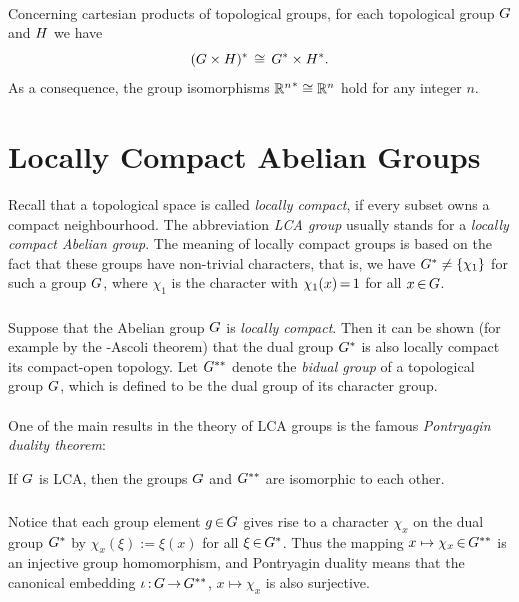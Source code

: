 \documentclass[11pt,twoside]{article}
\begin{document}
\paragraph{}
Concerning cartesian products of topological groups,
for each topological group $G$ and $H$
we have
\[
(G \times H)^*
\, \cong \,
G^* \times H^*.
\]
As a consequence,
the group isomorphisms ${{\mathbb{R}}^n}^* \cong {\mathbb{R}}^n$ hold for any integer $n$.

\section{Locally Compact Abelian Groups}
Recall that a topological space is called \textit{locally compact},
if every subset owns a compact neighbourhood.
The abbreviation \textit{LCA group} usually stands
for a \textit{locally compact Abelian group}.
The meaning of locally compact groups is based on the fact
that these groups have non-trivial characters,
that is,
we have $G^* \neq \{\chi_1\}$ for such a group ${G}$,
where $\chi_1$ is the character with $\chi_1(x) {\,=\,} 1$ for all $x {\,\in\,} G$.

\subparagraph{}
Suppose that the Abelian group ${G}$ is \textit{locally compact}.
Then it can be shown (for example by the {\ARZELA}-Ascoli theorem)
that the dual group $G^*$ is also locally compact {\wrt}
its compact-open topology.
Let $G^{**}$ denote the \textit{bidual group} 
of a topological group $G$,
which is defined to be the dual group of its character group.

\paragraph{} %
One of the main results in the theory of LCA groups is the famous
\textit{Pontryagin duality theorem}:

\begin{theorem1}\label{PONTRYAGIN_DUALITY_THEOREM}
If $G$ is LCA,
then the groups $G$ and $G^{**}$ are isomorphic to each other.
\end{theorem1}

\subparagraph{}
Notice that
each group element $g {\,\in\,} G$ gives rise to a character $\chi_x$
on the dual group $G^*$ by
$\chi_x(\xi) := \xi(x)$ for all $\xi {\,\in\,} G^*$.
Thus the mapping $x \mapsto \chi_x {\,\in\,} G^{**}$ is an injective group
homomorphism,
and Pontryagin duality means
that the canonical embedding $\iota {\,:\,} G {\,\to\,} G^{**}$,
$x \mapsto \chi_x$ is also surjective.
\end{document}
